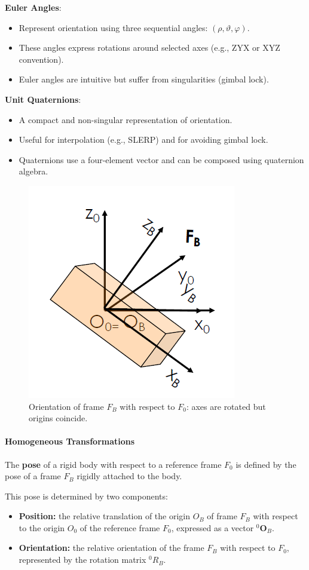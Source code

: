 \textbf{Euler Angles}:
\begin{itemize}
  \item Represent orientation using three sequential angles: $(\rho, \vartheta, \varphi)$.
  \item These angles express rotations around selected axes (e.g., ZYX or XYZ convention).
  \item Euler angles are intuitive but suffer from singularities (gimbal lock).
\end{itemize}

\textbf{Unit Quaternions}:
\begin{itemize}
  \item A compact and non-singular representation of orientation.
  \item Useful for interpolation (e.g., SLERP) and for avoiding gimbal lock.
  \item Quaternions use a four-element vector and can be composed using quaternion algebra.
\end{itemize}

\begin{figure}[H]
  \centering
  \includegraphics[width=0.4\linewidth]{imgs/relative_orientation.png}
  \caption{Orientation of frame $F_B$ with respect to $F_0$: axes are rotated but origins coincide.}
\end{figure}

\hfill

\paragraph{Homogeneous Transformations} \hfill

The \textbf{pose} of a rigid body with respect to a reference frame $F_0$ is defined by the pose of a frame $F_B$ rigidly attached to the body.

This pose is determined by two components:

\begin{itemize}
  \item \textbf{Position:} the relative translation of the origin $O_B$ of frame $F_B$ with respect to the origin $O_0$ of the reference frame $F_0$, expressed as a vector ${}^0\mathbf{O}_B$.
  \item \textbf{Orientation:} the relative orientation of the frame $F_B$ with respect to $F_0$, represented by the rotation matrix ${}^0R_B$.
\end{itemize}

